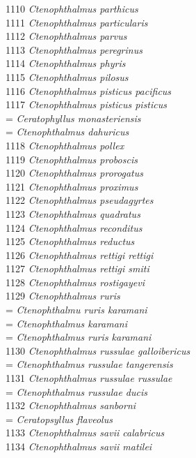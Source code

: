 \documentclass[
]{article}
\begin{document}
1110 \emph{Ctenophthalmus parthicus}\\
1111 \emph{Ctenophthalmus particularis}\\
1112 \emph{Ctenophthalmus parvus}\\
1113 \emph{Ctenophthalmus peregrinus}\\
1114 \emph{Ctenophthalmus phyris}\\
1115 \emph{Ctenophthalmus pilosus}\\
1116 \emph{Ctenophthalmus pisticus pacificus}\\
1117 \emph{Ctenophthalmus pisticus pisticus}\\
= \emph{Ceratophyllus monasteriensis}\\
= \emph{Ctenophthalmus dahuricus}\\
1118 \emph{Ctenophthalmus pollex}\\
1119 \emph{Ctenophthalmus proboscis}\\
1120 \emph{Ctenophthalmus prorogatus}\\
1121 \emph{Ctenophthalmus proximus}\\
1122 \emph{Ctenophthalmus pseudagyrtes}\\
1123 \emph{Ctenophthalmus quadratus}\\
1124 \emph{Ctenophthalmus reconditus}\\
1125 \emph{Ctenophthalmus reductus}\\
1126 \emph{Ctenophthalmus rettigi rettigi}\\
1127 \emph{Ctenophthalmus rettigi smiti}\\
1128 \emph{Ctenophthalmus rostigayevi}\\
1129 \emph{Ctenophthalmus ruris}\\
= \emph{Ctenophthalmu ruris karamani}\\
= \emph{Ctenophthalmus karamani}\\
= \emph{Ctenophthalmus ruris karamani}\\
1130 \emph{Ctenophthalmus russulae galloibericus}\\
= \emph{Ctenophthalmus russulae tangerensis}\\
1131 \emph{Ctenophthalmus russulae russulae}\\
= \emph{Ctenophthalmus russulae ducis}\\
1132 \emph{Ctenophthalmus sanborni}\\
= \emph{Ceratopsyllus flaveolus}\\
1133 \emph{Ctenophthalmus savii calabricus}\\
1134 \emph{Ctenophthalmus savii matilei}\\
\end{document}
